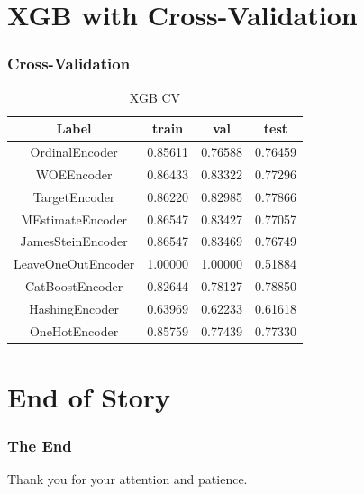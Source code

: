\documentclass{beamer}
\begin{document}
    \section{XGB with Cross-Validation}
    \begin{frame}
        \frametitle{Cross-Validation}
        \begin{table}[htb]
            \begin{center}
            {\renewcommand{\arraystretch}{0.4}
            \renewcommand{\tabcolsep}{0.4cm}
                \begin{tabular}[c]{|c|c|c|c|}
                    \hline
                    \textbf{Label}     & \textbf{train} & \textbf{val} & \textbf{test} \\
                    \hline
                    OrdinalEncoder     & 0.85611        & 0.76588      & 0.76459       \\
                    \hline
                    WOEEncoder         & 0.86433        & 0.83322      & 0.77296       \\
                    \hline
                    TargetEncoder      & 0.86220        & 0.82985      & 0.77866       \\
                    \hline
                    MEstimateEncoder   & 0.86547        & 0.83427      & 0.77057       \\
                    \hline
                    JamesSteinEncoder  & 0.86547        & 0.83469      & 0.76749       \\
                    \hline
                    LeaveOneOutEncoder & 1.00000        & 1.00000      & 0.51884       \\
                    \hline
                    CatBoostEncoder    & 0.82644        & 0.78127      & 0.78850       \\
                    \hline
                    HashingEncoder     & 0.63969        & 0.62233      & 0.61618       \\
                    \hline
                    OneHotEncoder      & 0.85759        & 0.77439      & 0.77330       \\
                    \hline
                \end{tabular}}
                \caption{XGB CV}
            \end{center}
        \end{table}
    \end{frame}


    \section{End of Story}
    \begin{frame}
        \frametitle{The End}
        Thank you for your attention and patience.
    \end{frame}
\end{document}
